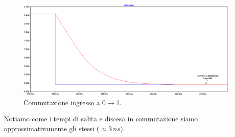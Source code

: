 \documentclass[a4paper,10pt]{article}
\begin{document}
\begin{figure}[h!]
  	\centering
 	\includegraphics[width=0.9\linewidth]{es2-3-scarica.png}
  	\caption{Commutazione ingresso a 0$\rightarrow$1.}
  	\label{fig:scarica32}
\end{figure}

\noindent Notiamo come i tempi di salita e discesa in commutazione siamo approssimativamente gli stessi ($\approx3\,ns$).

\newpage
\end{document}
